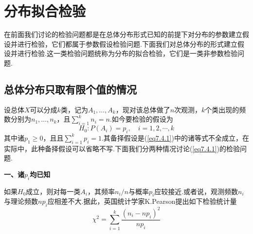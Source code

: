 \section{分布拟合检验}\label{sec:7.4}
在前面我们讨论的检验问题都是在总体分布形式已知的前提下对分布的参数建立假设并进行检验，它们都属于参数假设检验问题.下面我们对总体分布的形式建立假设并进行检验.这一类检验问题统称为分布的拟合检验，它们是一类非参数检验问题.

\subsection{总体分布只取有限个值的情况}\label{sec:7.3.1}
设总体$X$可以分成$k$类，记为$A_{1},\dotsc,A_{k}$，现对该总体做了$n$次观测，$k$个类出现的频数分别为$n_{1},\dotsc,n_{k}$，且$\sum _ { i = 1 } ^ { k } n _ { i } = n$.如今要检验的假设为
\begin{equation}\label{eq7.4.1}
H _ { 0 } : P \left( A _ { i } \right) = p _ { i } , \quad i = 1,2 , \cdots , k
\end{equation}
其中诸$p_{1}\geq 0$，且且$\sum _ { i = 1 } ^ { k } p _ { i } = 1$.其备择假设是(\ref{eq7.4.1})中的诸等式不全成立，在实际中，此种备择假设可以省略不写.下面我们分两种情况讨论(\ref{eq7.4.1})的检验问题.

\textbf{一、诸$p_{i}$均已知}

如果$H_{0}$成立，则对每一类$A_{i}$，其频率$n_{i}/n$与概率$p_{i}$应较接近.或者说，观测频数$n_{i}$与理论频数$np_{i}$应相差不大.据此，英国统计学家K.Pearson提出如下检验统计量
\begin{equation}\label{eq7.4.2}
\chi ^ { 2 } = \sum _ { i = 1 } ^ { k } \frac { \left( n _ { i } - n p _ { i } \right) ^ { 2 } } { n p _ { i } }
\end{equation}

